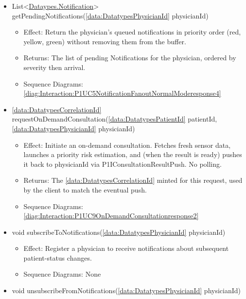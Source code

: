 \begin{description}
\begin{itemize}[noitemsep,nolistsep,leftmargin=-.25cm]
\begin{itemize}[noitemsep,nolistsep]
           \item Sequence Diagrams: \cref{diag:Interaction:P1UC6ConsultPatientStatusresponse1}
        \end{itemize}
      \item \textsf{List\textless{}{\colorbox{red!30}{\underline{Dataypes.Notification}}}\textgreater{} getPendingNotifications(\ref{data:DatatypesPhysicianId} physicianId)}
        \begin{itemize}[noitemsep,nolistsep]
           \item Effect: Return the physician's queued notifications in priority order (red, yellow, green) without removing them from the buffer. 
           \item Returns: The list of pending Notifications for the physician, ordered by severity then arrival.
           \item Sequence Diagrams: \cref{diag:Interaction:P1UC5NotificationFanoutNormalModeresponse4}
        \end{itemize}
      \item \textsf{\ref{data:DatatypesCorrelationId} requestOnDemandConsultation(\ref{data:DatatypesPatientId} patientId, \ref{data:DatatypesPhysicianId} physicianId)}
        \begin{itemize}[noitemsep,nolistsep]
           \item Effect: Initiate an on-demand consultation. Fetches fresh sensor data, launches a priority risk estimation, and (when the result is ready) pushes it back to physicianId via P1IConsultationResultPush. No polling. 
           \item Returns: The \ref{data:DatatypesCorrelationId} minted for this request, used by the client to match the eventual push.
           \item Sequence Diagrams: \cref{diag:Interaction:P1UC9OnDemandConsultationresponse2}
        \end{itemize}
      \item \textsf{void subscribeToNotifications(\ref{data:DatatypesPhysicianId} physicianId)}
        \begin{itemize}[noitemsep,nolistsep]
           \item Effect: Register a physician to receive notifications about subsequent patient-status changes. 
           \item Sequence Diagrams: None
        \end{itemize}
      \item \textsf{void unsubscribeFromNotifications(\ref{data:DatatypesPhysicianId} physicianId)}

\end{itemize}
\end{description}

